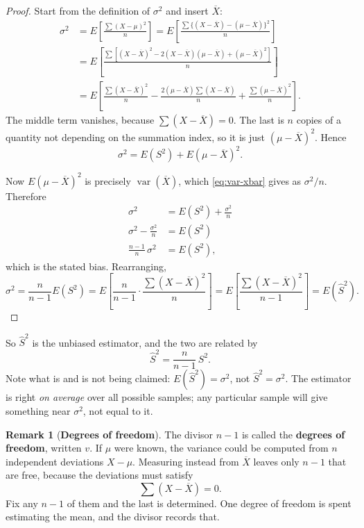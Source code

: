 \documentclass[11pt,a4paper]{article}
\theoremstyle{definition}
\newtheorem{remark}[thm]{Remark}
\begin{document}
\begin{proof}
Start from the definition of $\sigma^2$ and insert $\overline{X}$:
\begin{align*}
\sigma^2 &=E\!\left[\frac{\sum (X-\mu)^2}{n}\right]
          =E\!\left[\frac{\sum\{(X-\overline{X})-(\mu-\overline{X})\}^2}{n}\right]\\
 &=E\!\left[\frac{\sum[(X-\overline{X})^2-2(X-\overline{X})(\mu-\overline{X})+(\mu-\overline{X})^2]}{n}\right]\\
 &=E\!\left[\frac{\sum (X-\overline{X})^2}{n}
   -\frac{2(\mu-\overline{X})\sum (X-\overline{X})}{n}
   +\frac{\sum(\mu-\overline{X})^2}{n}\right].
\end{align*}
The middle term vanishes, because $\sum(X-\overline{X})=0$. The last is $n$ copies of a
quantity not depending on the summation index, so it is just $(\mu-\overline{X})^2$. Hence
\[\sigma^2=E(S^2)+E(\mu-\overline{X})^2.\]

Now $E(\mu-\overline{X})^2$ is precisely $\operatorname{var}(\overline{X})$, which
\eqref{eq:var-xbar} gives as $\sigma^2/n$. Therefore
\begin{align*}
\sigma^2 &=E(S^2)+\frac{\sigma^2}{n}\\
\sigma^2-\frac{\sigma^2}{n} &=E(S^2)\\
\frac{n-1}{n}\,\sigma^2 &=E(S^2),
\end{align*}
which is the stated bias. Rearranging,
\[\sigma^2=\frac{n}{n-1}E(S^2)=E\!\left[\frac{n}{n-1}\cdot\frac{\sum(X-\overline{X})^2}{n}\right]
=E\!\left[\frac{\sum(X-\overline{X})^2}{n-1}\right]=E(\hat{S}^2).\]
\end{proof}

So $\hat{S}^2$ is the unbiased estimator, and the two are related by
\[\hat{S}^2=\frac{n}{n-1}\,S^2.\]
Note what is and is not being claimed: $E(\hat{S}^2)=\sigma^2$, not $\hat{S}^2=\sigma^2$. The
estimator is right \emph{on average} over all possible samples; any particular sample will
give something near $\sigma^2$, not equal to it.

\begin{remark}[\textbf{Degrees of freedom}]
The divisor $n-1$ is called the \textbf{degrees of freedom}, written $v$. If $\mu$ were known,
the variance could be computed from $n$ independent deviations $X-\mu$. Measuring instead from
$\overline{X}$ leaves only $n-1$ that are free, because the deviations must satisfy
\[\sum (X-\overline{X})=0.\]
Fix any $n-1$ of them and the last is determined. One degree of freedom is spent estimating
the mean, and the divisor records that.
\end{remark}
\end{document}
